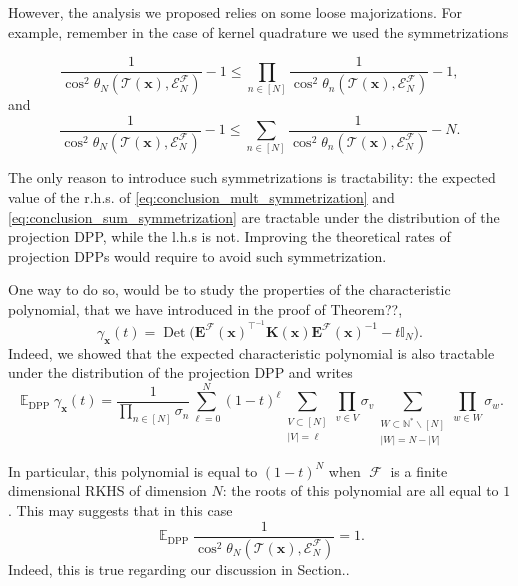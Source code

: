 \documentclass[twoside,11pt]{book}
\numberwithin{theorem}{chapter}
\numberwithin{definition}{chapter}
\numberwithin{proposition}{chapter}
\numberwithin{corollary}{chapter}
\numberwithin{example}{chapter}
\numberwithin{lemma}{chapter}
\numberwithin{assumption}{chapter}
\numberwithin{equation}{chapter}
\numberwithin{figure}{chapter}
\DeclareMathOperator{\Det}{Det}
\DeclareMathOperator{\DPP}{\mathrm{DPP}}
\DeclareMathOperator{\Tran}{\intercal}
\DeclareMathOperator{\EX}{\mathbb{E}}
\DeclareMathOperator{\F}{\mathcal{F}}
\begin{document}
However, the analysis we proposed relies on some loose majorizations.
For example, remember in the case of kernel quadrature we used the symmetrizations

\begin{equation}\label{eq:conclusion_mult_symmetrization}
\frac{1}{\cos^{2} \theta_{N}(\mathcal{T}(\bm{x}),\mathcal{E}^{\mathcal{F}}_{N})} - 1 \leq \prod\limits_{n \in [N]}\frac{1}{\cos^{2} \theta_{n}(\mathcal{T}(\bm{x}),\mathcal{E}^{\mathcal{F}}_{N})} -1, 
\end{equation}
and
\begin{equation}\label{eq:conclusion_sum_symmetrization}
\frac{1}{\cos^{2} \theta_{N}(\mathcal{T}(\bm{x}),\mathcal{E}^{\mathcal{F}}_{N})} - 1 \leq \sum\limits_{n \in [N]}\frac{1}{\cos^{2} \theta_{n}(\mathcal{T}(\bm{x}),\mathcal{E}^{\mathcal{F}}_{N})} -N. 
\end{equation}

The only reason to introduce such symmetrizations is tractability: the expected value of the r.h.s. of \eqref{eq:conclusion_mult_symmetrization} and \eqref{eq:conclusion_sum_symmetrization} are tractable under the distribution of the projection DPP, while the l.h.s is not. Improving the theoretical rates of projection DPPs would require to avoid such symmetrization.

One way to do so, would be to study the properties of the characteristic polynomial, that we have introduced in the proof of Theorem??, 
\begin{equation}
\gamma_{\bm{x}}(t) =  \Det \big(  \bm{E}^{\mathcal{F}}(\bm{x})^{\Tran^{-1}}\bm{K}(\bm{x})\bm{E}^{\mathcal{F}}(\bm{x})^{-1} -t \mathbb{I}_{N} \big).
\end{equation}
Indeed, we showed that the expected characteristic polynomial is also tractable under the distribution of the projection DPP and writes
\begin{equation}\label{eq:conclusion_expected_char_polynomial}
\EX_{\DPP} \gamma_{\bm{x}}(t) =  \frac{1}{\prod\limits_{n \in [N]}\sigma_n} \sum\limits_{\ell =0}^{N} (1-t)^{\ell} \sum\limits_{\substack{V \subset [N]\\|V| = \ell}} \prod\limits_{v \in V}\sigma_{v}  \sum\limits_{\substack{W \subset \mathbb{N}^{*} \smallsetminus[N]\\  |W|= N-|V|}}  \prod\limits_{w \in W}\sigma_{w}.
\end{equation}

In particular, this polynomial is equal to $(1-t)^{N}$ when $\F$ is a finite dimensional RKHS of dimension $N$: the roots of this polynomial are all equal to $1$. This may suggests that in this case
\begin{equation}
\EX_{\DPP}\frac{1}{\cos^{2}\theta_{N}(\mathcal{T}(\bm{x}), \mathcal{E}_{N}^{\F})} =1.
\end{equation}
Indeed, this is true regarding our discussion in Section.. 
\end{document}
